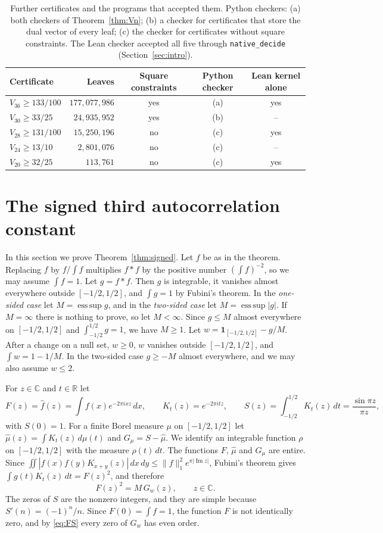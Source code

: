 \documentclass[11pt]{amsart}
\theoremstyle{definition}
\theoremstyle{remark}
\numberwithin{equation}{section}
\newcommand{\R}{\mathbb{R}}
\newcommand{\C}{\mathbb{C}}
\newcommand{\one}{\mathbf{1}}
\newcommand{\im}{\operatorname{Im}}
\newcommand{\esssup}{\operatorname*{ess\,sup}}
\newcommand{\NleavesB}{177{,}077{,}986}
\begin{document}
\begin{table}[ht]
\centering
\caption{Further certificates and the programs that accepted them. Python checkers: (a) both checkers of Theorem~\ref{thm:Vn}; (b) a checker for certificates that store the dual vector of every leaf; (c) the checker for certificates without square constraints. The Lean checker accepted all five through \texttt{native\_decide} (Section~\ref{sec:intro}).}\label{tab:small}
\small
\begin{tabular}{@{}lrccc@{}}
\toprule
Certificate & Leaves & Square constraints & Python checker & Lean kernel alone\\
\midrule
$V_{36}\ge133/100$ & $\NleavesB$ & yes & (a) & yes\\
$V_{30}\ge33/25$ & $24{,}935{,}952$ & yes & (b) & --\\
$V_{28}\ge131/100$ & $15{,}250{,}196$ & no & (c) & yes\\
$V_{24}\ge13/10$ & $2{,}801{,}076$ & no & (c) & --\\
$V_{20}\ge32/25$ & $113{,}761$ & no & (c) & yes\\
\bottomrule
\end{tabular}
\end{table}

\section{The signed third autocorrelation constant}\label{sec:signed}

In this section we prove Theorem~\ref{thm:signed}. Let $f$ be as in the theorem. Replacing $f$ by $f/\int f$ multiplies $f*f$ by the positive number $(\int f)^{-2}$, so we may assume $\int f=1$. Let $g=f*f$. Then $g$ is integrable, it vanishes almost everywhere outside $[-1/2,1/2]$, and $\int g=1$ by Fubini's theorem. In the \emph{one-sided case} let $M=\esssup g$, and in the \emph{two-sided case} let $M=\esssup|g|$. If $M=\infty$ there is nothing to prove, so let $M<\infty$. Since $g\le M$ almost everywhere on $[-1/2,1/2]$ and $\int_{-1/2}^{1/2}g=1$, we have $M\ge1$. Let $w=\one_{[-1/2,1/2]}-g/M$. After a change on a null set, $w\ge0$, $w$ vanishes outside $[-1/2,1/2]$, and $\int w=1-1/M$. In the two-sided case $g\ge-M$ almost everywhere, and we may also assume $w\le2$.

For $z\in\C$ and $t\in\R$ let
\[
F(z)=\hat f(z)=\int f(x)e^{-2\pi ixz}\,dx,\qquad K_t(z)=e^{-2\pi itz},\qquad S(z)=\int_{-1/2}^{1/2}K_t(z)\,dt=\frac{\sin\pi z}{\pi z},
\]
with $S(0)=1$. For a finite Borel measure $\mu$ on $[-1/2,1/2]$ let $\hat\mu(z)=\int K_t(z)\,d\mu(t)$ and $G_\mu=S-\hat\mu$. We identify an integrable function $\rho$ on $[-1/2,1/2]$ with the measure $\rho(t)\,dt$. The functions $F$, $\hat\mu$ and $G_\mu$ are entire. Since $\iint|f(x)f(y)K_{x+y}(z)|\,dx\,dy\le\|f\|_1^2e^{\pi|\im z|}$, Fubini's theorem gives $\int g(t)K_t(z)\,dt=F(z)^2$, and therefore
\begin{equation}\label{eq:FS}
F(z)^2=M\,G_w(z),\qquad z\in\C.
\end{equation}
The zeros of $S$ are the nonzero integers, and they are simple because $S'(n)=(-1)^n/n$. Since $F(0)=\int f=1$, the function $F$ is not identically zero, and by \eqref{eq:FS} every zero of $G_w$ has even order.
\end{document}
